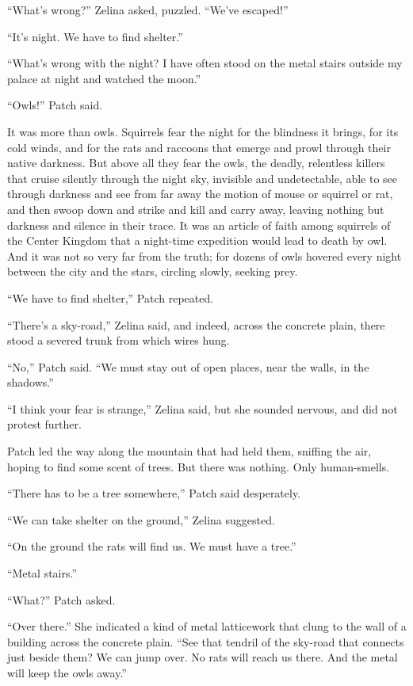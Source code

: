 \documentclass[12pt]{memoir}
\begin{document}
“What’s wrong?” Zelina asked, puzzled. “We’ve escaped!”

“It’s night. We have to find shelter.”

“What’s wrong with the night? I have often stood on the metal stairs
outside my palace at night and watched the moon.”

“Owls!” Patch said.

It was more than owls. Squirrels fear the night for the blindness it
brings, for its cold winds, and for the rats and raccoons that emerge
and prowl through their native darkness. But above all they fear the
owls, the deadly, relentless killers that cruise silently through the
night sky, invisible and undetectable, able to see through darkness
and see from far away the motion of mouse or squirrel or rat, and then
swoop down and strike and kill and carry away, leaving nothing but
darkness and silence in their trace. It was an article of faith among
squirrels of the Center Kingdom that a night-time expedition would
lead to death by owl. And it was not so very far from the truth; for
dozens of owls hovered every night between the city and the stars,
circling slowly, seeking prey.

“We have to find shelter,” Patch repeated.

“There’s a sky-road,” Zelina said, and indeed, across the concrete
plain, there stood a severed trunk from which wires hung.

“No,” Patch said. “We must stay out of open places, near the walls, in
the shadows.”

“I think your fear is strange,” Zelina said, but she sounded nervous,
and did not protest further.

Patch led the way along the mountain that had held them, sniffing the
air, hoping to find some scent of trees. But there was nothing. Only
human-smells.

“There has to be a tree somewhere,” Patch said desperately.

“We can take shelter on the ground,” Zelina suggested.

“On the ground the rats will find us. We must have a tree.”

“Metal stairs.”

“What?” Patch asked.

“Over there.” She indicated a kind of metal latticework that clung to
the wall of a building across the concrete plain. “See that tendril of
the sky-road that connects just beside them? We can jump over. No rats
will reach us there. And the metal will keep the owls away.”
\end{document}
